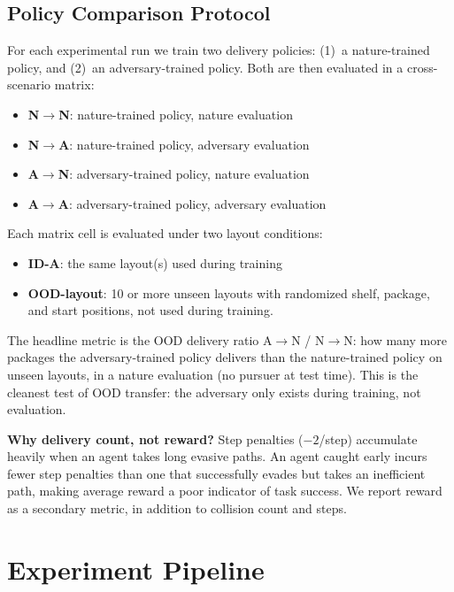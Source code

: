 \documentclass[sigconf]{aamas}
\begin{document}
\subsection{Policy Comparison Protocol}

For each experimental run we train two delivery policies:
(1)~a nature-trained policy, and (2)~an adversary-trained policy.
Both are then evaluated in a cross-scenario matrix:

\begin{itemize}
  \item \textbf{N$\to$N}: nature-trained policy, nature evaluation
  \item \textbf{N$\to$A}: nature-trained policy, adversary evaluation
  \item \textbf{A$\to$N}: adversary-trained policy, nature evaluation
  \item \textbf{A$\to$A}: adversary-trained policy, adversary evaluation
\end{itemize}

Each matrix cell is evaluated under two layout conditions:
\begin{itemize}
  \item \textbf{ID-A}: the same layout(s) used during training
  \item \textbf{OOD-layout}: 10 or more unseen layouts with randomized shelf, package, and start positions, not used during training.
\end{itemize}

The headline metric is the OOD delivery ratio A$\to$N / N$\to$N: how many more packages the adversary-trained policy delivers than the nature-trained policy on unseen layouts, in a nature evaluation (no pursuer at test time). This is the cleanest test of OOD transfer: the adversary only exists during training, not evaluation.

\textbf{Why delivery count, not reward?} Step penalties ($-2$/step) accumulate
heavily when an agent takes long evasive paths. An agent caught early incurs fewer
step penalties than one that successfully evades but takes an inefficient path,
making average reward a poor indicator of task success. We report reward as a
secondary metric, in addition to collision count and steps.

\section{Experiment Pipeline}
\label{sec:pipeline}
\end{document}
